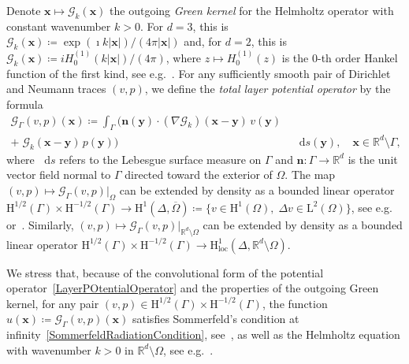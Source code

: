 \documentclass[a4paper,11pt]{article}
\newcommand{\RR}{\mathbb{R}}
\newcommand{\mrm}{\mathrm}
\newcommand{\mL}{\mathrm{L}}
\newcommand{\mH}{\mathrm{H}}
\newcommand{\by}{\boldsymbol{y}}
\newcommand{\bx}{\boldsymbol{x}}
\newcommand{\bn}{\boldsymbol{n}}
\newcommand{\diff}{\mathop{}\!\mathrm{d}}   %
\begin{document}
\medskip
Denote $\bx\mapsto \mathscr{G}_{k}(\bx)$ the outgoing \emph{Green kernel} for the Helmholtz operator with constant wavenumber $k>0$. For $d = 3$, this is
$\mathscr{G}_k(\bx)\coloneq \exp(\imath k\vert \bx\vert)/(4\pi\vert \bx\vert)$
and, for $d = 2$, this is $\mathscr{G}_k(\bx)\coloneq i H^{(1)}_{0}(k\vert
\bx\vert)/(4\pi)$, where $z\mapsto H^{(1)}_{0}(z)$ is the $0$-th
order Hankel function of the first kind, see e.g.~\cite[Chap.10]{MR2723248}. For any sufficiently
smooth pair of Dirichlet and Neumann traces $(v,p)$, we define the
\emph{total layer potential operator} by the formula
\begin{equation}\label{LayerPOtentialOperator}
  \begin{aligned}
  \mathcal{G}_{\Gamma}(v,p)(\bx)\coloneq
  \int_{\Gamma} \bigl(\bn(\by)\cdot(\nabla\mathscr{G}_k)(\bx-\by)\,v(\by) & \\
  +\;\mathscr{G}_k(\bx-\by)\,p(\by) \bigr) & \; \diff s(\by),\quad \bx\in \RR^d\setminus\Gamma,
  \end{aligned}
\end{equation}
where $\diff s$ refers to the Lebesgue surface measure on $\Gamma$ and
$\bn\colon\Gamma\to \RR^d$ is the unit vector field normal to $\Gamma$
directed toward the exterior of $\Omega$. The map $(v,p)\mapsto
\mathcal{G}_{\Gamma}(v,p)\vert_{\Omega}$ can be extended by density as
a bounded linear operator $\mH^{1/2}(\Gamma)\times
\mH^{-1/2}(\Gamma)\to \mH^{1}(\Delta,\overline{\Omega})\coloneq\{v\in
\mH^{1}(\Omega),\;\Delta v\in \mL^{2}(\Omega)\}$, see
e.g.~\cite[Thm.3.1.16]{MR2743235} or~\cite[Thm.6.11]{MR1742312}.
Similarly, $(v,p)\mapsto
\mathcal{G}_{\Gamma}(v,p)\vert_{\RR^d\setminus\Omega}$ can be extended
by density as a bounded linear operator $\mH^{1/2}(\Gamma)\times
\mH^{-1/2}(\Gamma)\to
\mH^{1}_{\mrm{loc}}(\Delta,\RR^d\setminus\Omega)$.

\medskip
We stress that, because of the convolutional form of the potential
operator~\eqref{LayerPOtentialOperator} and the properties of the outgoing
Green kernel, for any pair $(v,p)\in \mH^{1/2}(\Gamma)\times\mH^{-1/2}(\Gamma)$,
the function $u(\bx)\coloneq \mathcal{G}_{\Gamma}(v,p)(\bx)$ satisfies
Sommerfeld's condition at infinity~\eqref{SommerfeldRadiationCondition}, see~\cite{Sommerfeld1912,MR29463,MR103705,MR1822275}, as well as the Helmholtz equation with wavenumber $k>0$ in $\RR^d\setminus\Omega$, see e.g.~\cite[§2.4]{CoKr:bookIEM:1983}.
\end{document}
